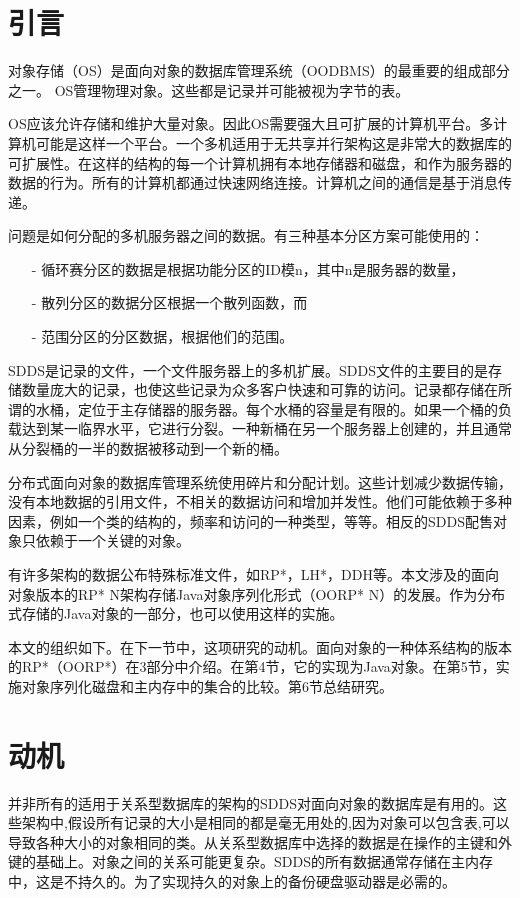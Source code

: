 \documentclass[10pt,a4paper]{article}
\begin{document}
\begin{CJK*}{UTF8}{gkai}
\section{引言}
对象存储（OS）是面向对象的数据库管理系统（OODBMS）\cite{1}的最重要的组成部分之一。 OS管理物理对象。这些都是记录并可能被视为字节的表。


OS应该允许存储和维护大量对象。因此OS需要强大且可扩展的计算机平台。多计算机可能是这样一个平台。一个多机适用于无共享并行架构\cite{2}这是非常大的数据库的可扩展性\cite{3}。在这样的结构的每一个计算机拥有本地存储器和磁盘，和作为服务器的数据的行为\cite{4}。所有的计算机都通过快速网络连接。计算机之间的通信是基于消息传递。


问题是如何分配的多机服务器之间的数据。有三种基本分区方案可能使用的\cite{4}：
\begin{itemize}
\item[-] 循环赛分区的数据是根据功能分区的ID模n，其中n是服务器的数量，
\item[-] 散列分区的数据分区根据一个散列函数，而
\item[-] 范围分区的分区数据，根据他们的范围。
\end{itemize}


SDDS是记录的文件，一个文件服务器上的多机扩展。SDDS文件的主要目的是存储数量庞大的记录，也使这些记录为众多客户快速和可靠的访问。记录都存储在所谓的水桶，定位于主存储器的服务器。每个水桶的容量是有限的。如果一个桶的负载达到某一临界水平，它进行分裂。一种新桶在另一个服务器上创建的，并且通常从分裂桶的一半的数据被移动到一个新的桶。


分布式面向对象的数据库管理系统使用碎片和分配计划。这些计划减少数据传输，没有本地数据的引用文件，不相关的数据访问和增加并发性\cite{5,6}。他们可能依赖于多种因素，例如一个类的结构的，频率和访问的一种类型，等等。相反的SDDS配售对象只依赖于一个关键的对象。


有许多架构的数据公布特殊标准文件，如RP*\cite{7}，LH*\cite{8}，DDH\cite{9}等。本文涉及的面向对象版本的RP* N架构存储Java对象序列化形式（OORP* N）的发展。作为分布式存储的Java对象的一部分，也可以使用这样的实施。


本文的组织如下。在下一节中，这项研究的动机。面向对象的一种体系结构的版本的RP*（OORP*）在3部分中介绍。在第4节，它的实现为Java对象。在第5节，实施对象序列化磁盘和主内存中的集合的比较。第6节总结研究。

\section{动机}
并非所有的适用于关系型数据库的架构的SDDS对面向对象的数据库是有用的。这些架构中,假设所有记录的大小是相同的都是毫无用处的,因为对象可以包含表,可以导致各种大小的对象相同的类。从关系型数据库中选择的数据是在操作的主键和外键的基础上。对象之间的关系可能更复杂。SDDS的所有数据通常存储在主内存中，这是不持久的。为了实现持久的对象上的备份硬盘驱动器是必需的。



\end{CJK*}
\end{document}
